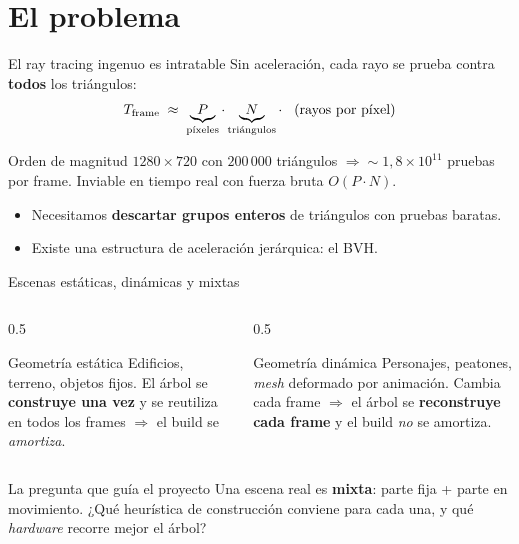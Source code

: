 \documentclass[aspectratio=169,11pt]{beamer}
\newcommand{\hl}[1]{{\color{primdk}\textbf{#1}}}
\begin{document}
\section{El problema}

\begin{frame}{El ray tracing ingenuo es intratable}
Sin aceleraci\'on, cada rayo se prueba contra \hl{todos} los tri\'angulos:
\[
T_{\text{frame}} \;\approx\; \underbrace{P}_{\text{p\'ixeles}}\cdot
\underbrace{N}_{\text{tri\'angulos}}\cdot \hspace{0.3cm} (\text{rayos por p\'ixel})
\]
\begin{alertblock}{Orden de magnitud}
$1280\times720$ con $200\,000$ tri\'angulos $\Rightarrow \sim\!1{,}8\times10^{11}$
pruebas por frame. Inviable en tiempo real con fuerza bruta $O(P\cdot N)$.
\end{alertblock}
\begin{itemize}
  \item Necesitamos \hl{descartar grupos enteros} de tri\'angulos con pruebas baratas.
  \item Existe una estructura de aceleraci\'on jer\'arquica: el \alert{BVH}.
\end{itemize}
\end{frame}
\begin{frame}{Escenas est\'aticas, din\'amicas y mixtas}
\begin{columns}[T]
\begin{column}{0.5\textwidth}
\begin{block}{Geometr\'ia est\'atica}
Edificios, terreno, objetos fijos. El \'arbol se \hl{construye una vez} y se
reutiliza en todos los frames $\Rightarrow$ el build se \emph{amortiza}.
\end{block}
\end{column}
\begin{column}{0.5\textwidth}
\begin{exampleblock}{Geometr\'ia din\'amica}
Personajes, peatones, \emph{mesh} deformado por animaci\'on. Cambia cada frame
$\Rightarrow$ el \'arbol se \hl{reconstruye cada frame} y el build \emph{no} se amortiza.
\end{exampleblock}
\end{column}
\end{columns}
\vspace{5pt}
\begin{alertblock}{La pregunta que gu\'ia el proyecto}
Una escena real es \hl{mixta}: parte fija + parte en movimiento. ¿Qu\'e heur\'istica
de construcci\'on conviene para cada una, y qu\'e \emph{hardware} recorre mejor el \'arbol?
\end{alertblock}
\end{frame}
\end{document}
